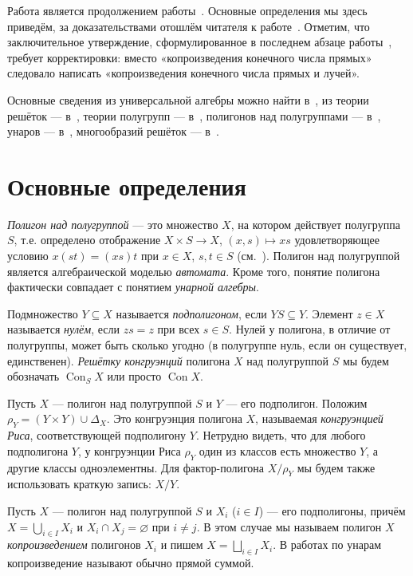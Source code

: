 \documentclass[11pt,twoside,draft
]{article}
\def\Con{\operatorname{Con}}
\begin{document}
Работа является продолжением работы~\cite{Kozhukhov_8}.
Основные определения мы здесь приведём, за доказательствами отошлём читателя к работе~\cite{Kozhukhov_8}.
Отметим, что заключительное утверждение, сформулированное в последнем абзаце работы~\cite{Kozhukhov_8}, требует корректировки: вместо «копроизведения конечного числа прямых» следовало написать «копроизведения конечного числа прямых и лучей».

Основные сведения из универсальной алгебры можно найти в~\cite{Kohn_9}, из теории решёток — в~\cite{Gretzer_10}, теории полугрупп — в~\cite{Clifford_11}, полигонов над полугруппами — в~\cite{Kilp_1}, унаров — в~\cite{Jakubikova_12}, многообразий решёток — в~\cite{Jipsen_13}.


\section{Основные определения}

\textit{Полигон над полугруппой} — это множество $X$, на котором действует полугруппа $S$, т.е. определено отображение $X \times S \to X$, $(x,s) \mapsto xs$ удовлетворяющее условию $x(st) = (xs)t$ при $x \in X$, $s,t \in S$ (см.~\cite{Kilp_1}).
Полигон над полугруппой является алгебраической моделью \textit{автомата}.
Кроме того, понятие полигона фактически совпадает с понятием \textit{унарной алгебры}.

Подмножество $Y \subseteq X$ называется \textit{подполигоном}, если $YS \subseteq Y$.
Элемент $z \in X$ называется \textit{нулём}, если $zs = z$ при всех $s \in S$.
Нулей у полигона, в отличие от полугруппы, может быть сколько угодно (в полугруппе нуль, если он существует, единственен).
\textit{Решётку конгруэнций} полигона $X$ над полугруппой $S$ мы будем обозначать $\Con_S X$ или просто $\Con X$.

Пусть $X$ — полигон над полугруппой $S$ и $Y$ — его подполигон.
Положим $ \rho_Y = (Y \times Y) \cup \Delta_X $.
Это конгруэнция полигона $X$, называемая \textit{конгруэнцией Риса}, соответствующей подполигону $Y$.
Нетрудно видеть, что для любого подполигона $Y$, у конгруэнции Риса $\rho_Y$ один из классов есть множество $Y$, а другие классы одноэлементны.
Для фактор-полигона $X/\rho_Y$ мы будем также использовать краткую запись: $X/Y$.

Пусть $X$ — полигон над полугруппой $S$ и $X_i$ ($i \in I$) — его подполигоны, причём $X = \bigcup_{i \in I} X_{i}$ и $X_{i} \cap X_{j} = \varnothing$ при $i \neq j$.
В этом случае мы называем полигон $X$ \textit{копроизведением} полигонов $X_i$ и пишем $X = \bigsqcup_{i \in I} X_{i}$.
В работах по унарам копроизведение называют обычно прямой суммой.
\end{document}
